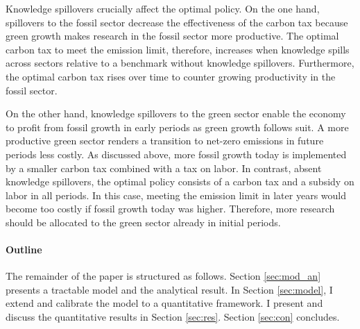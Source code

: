 Knowledge spillovers crucially affect the optimal policy. On the one hand, spillovers to the fossil sector decrease the effectiveness of the carbon tax because green growth makes research in the fossil sector more productive. The optimal carbon tax to meet the emission limit, therefore, increases when knowledge spills across sectors relative to a benchmark without knowledge spillovers. Furthermore, the optimal carbon tax rises over time to counter growing productivity in the fossil sector. 

On the other hand, knowledge spillovers to the green sector enable the economy to profit from fossil growth in early periods as green growth follows suit. A more productive green sector renders a transition to net-zero emissions in future periods less costly. As discussed above, more fossil growth today is implemented by a smaller carbon tax combined with a tax on labor. In contrast, absent knowledge spillovers, the optimal policy consists of a carbon tax and a subsidy on labor in all periods. In this case, meeting the emission limit in later years would become too costly if fossil growth today was higher. Therefore, more research should be allocated to the green sector already in initial periods. 



\paragraph{Outline}
The remainder of the paper is structured as follows. Section \ref{sec:mod_an} presents a tractable model and the analytical result. In Section \ref{sec:model}, I extend and calibrate the model to a quantitative framework. I present and discuss the quantitative results in Section \ref{sec:res}. Section \ref{sec:con} concludes.